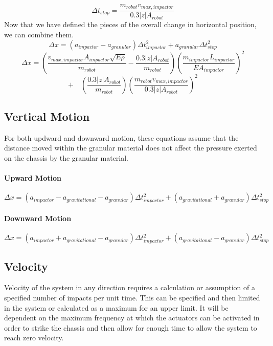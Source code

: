 \documentclass{article}
\begin{document}
$$\Delta t_{stop} = \dfrac{m_{robot} v_{max, impactor}}{0.3 |z| A_{robot}}$$
Now that we have defined the pieces of the overall change in horizontal position, we can combine them.
$$\Delta x = (a_{impactor} - a_{granular}) \Delta t^2_{impactor} + a_{granular} \Delta t_{stop}^2$$
$$\Delta x = (\dfrac{v_{max, impactor} A_{impactor} \sqrt{E \rho}}{m_{robot}} - \dfrac{0.3 |z| A_{robot}}{m_{robot}}) (\dfrac{m_{impactor} L_{impactor}}{E A_{impactor}})^2$$
\newline
$$+ \quad (\dfrac{0.3 |z| A_{robot}}{m_{robot}}) (\dfrac{m_{robot} v_{max, impactor}}{0.3 |z| A_{robot}})^2$$
\subsection{Vertical Motion}
For both updward and downward motion, these equations assume that the distance moved within the granular material does not affect the pressure exerted on the chassis by the granular material.
\paragraph{Upward Motion}
$$\Delta x = (a_{impactor} - a_{gravitational} - a_{granular}) \Delta t^2_{impactor} + (a_{gravitaitonal} + a_{granular}) \Delta t_{stop}^2$$
\paragraph{Downward Motion}
$$\Delta x = (a_{impactor} + a_{gravitational} - a_{granular}) \Delta t^2_{impactor} + (a_{gravitaitonal} - a_{granular}) \Delta t_{stop}^2$$
\subsection{Velocity}
Velocity of the system in any direction requires a calculation or assumption of a specified number of impacts per unit time. This can be specified and then limited in the system or calculated as a maximum for an upper limit. It will be dependent on the maximum frequency at which the actuators can be activated in order to strike the chassis and then allow for enough time to allow the system to reach zero velocity.
\end{document}
